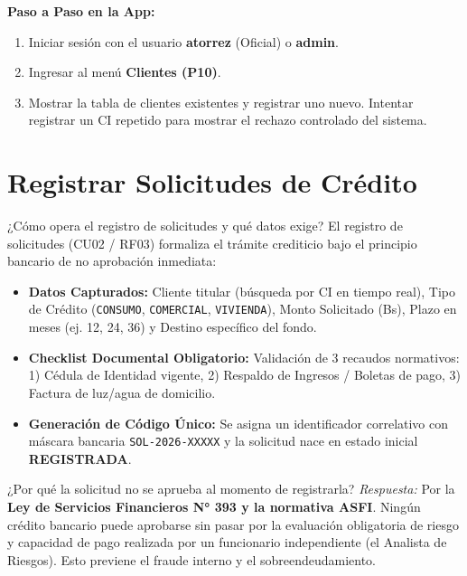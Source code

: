 \documentclass[11pt,letterpaper]{article}
\begin{document}
\begin{demobox}
\textbf{Paso a Paso en la App:}
\begin{enumerate}
    \item Iniciar sesión con el usuario \textbf{atorrez} (Oficial) o \textbf{admin}.
    \item Ingresar al menú \textbf{Clientes (P10)}.
    \item Mostrar la tabla de clientes existentes y registrar uno nuevo. Intentar registrar un CI repetido para mostrar el rechazo controlado del sistema.
\end{enumerate}
\end{demobox}

\section{Registrar Solicitudes de Crédito}

\begin{respuestabox}{¿Cómo opera el registro de solicitudes y qué datos exige?}
El registro de solicitudes (CU02 / RF03) formaliza el trámite crediticio bajo el principio bancario de no aprobación inmediata:
\begin{itemize}
    \item \textbf{Datos Capturados:} Cliente titular (búsqueda por CI en tiempo real), Tipo de Crédito (\texttt{CONSUMO}, \texttt{COMERCIAL}, \texttt{VIVIENDA}), Monto Solicitado (Bs), Plazo en meses (ej. 12, 24, 36) y Destino específico del fondo.
    \item \textbf{Checklist Documental Obligatorio:} Validación de 3 recaudos normativos: 1) Cédula de Identidad vigente, 2) Respaldo de Ingresos / Boletas de pago, 3) Factura de luz/agua de domicilio.
    \item \textbf{Generación de Código Único:} Se asigna un identificador correlativo con máscara bancaria \texttt{SOL-2026-XXXXX} y la solicitud nace en estado inicial \textbf{REGISTRADA}.
\end{itemize}
\end{respuestabox}

\begin{preguntatrampabox}{¿Por qué la solicitud no se aprueba al momento de registrarla?}
\textit{Respuesta:} Por la \textbf{Ley de Servicios Financieros N° 393 y la normativa ASFI}. Ningún crédito bancario puede aprobarse sin pasar por la evaluación obligatoria de riesgo y capacidad de pago realizada por un funcionario independiente (el Analista de Riesgos). Esto previene el fraude interno y el sobreendeudamiento.
\end{preguntatrampabox}
\end{document}
